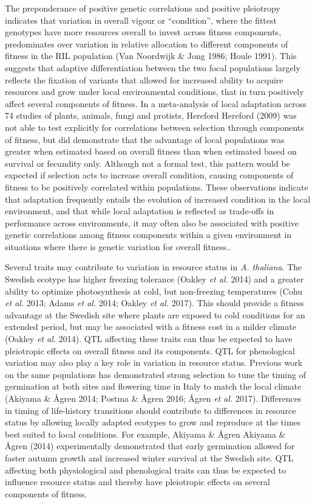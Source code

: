 \documentclass[12pt,]{article}
\begin{document}
The preponderance of positive genetic correlations and positive pleiotropy indicates that variation in overall vigour or ``condition'', where the fittest genotypes have more resources overall to invest across fitness components, predominates over variation in relative allocation to different components of fitness in the RIL population (Van Noordwijk \& Jong 1986; Houle 1991). This suggests that adaptive differentiation between the two focal populations largely reflects the fixation of variants that allowed for increased ability to acquire resources and grow under local environmental conditions, that in turn positively affect several components of fitness.
In a meta-analysis of local adaptation across 74 studies of plants, animals, fungi and protists, Hereford Hereford (2009) was not able to test explicitly for correlations between selection through components of fitness, but did demonstrate that the advantage of local populations was greater when estimated based on overall fitness than when estimated based on survival or fecundity only.
Although not a formal test, this pattern would be expected if selection acts to increase overall condition, causing components of fitness to be positively correlated within populations.
These observations indicate that adaptation frequently entails the evolution of increased condition in the local environment, and that while local adaptation is reflected as trade-offs in performance across environments, it may often also be associated with positive genetic correlations among fitness components within a given environment in situations where there is genetic variation for overall fitness..

Several traits may contribute to variation in resource status in \emph{A. thaliana}. The Swedish ecotype has higher freezing tolerance (Oakley \emph{et al.} 2014) and a greater ability to optimize photosynthesis at cold, but non-freezing temperatures (Cohu \emph{et al.} 2013; Adams \emph{et al.} 2014; Oakley \emph{et al.} 2017). This should provide a fitness advantage at the Swedish site where plants are exposed to cold conditions for an extended period, but may be associated with a fitness cost in a milder climate (Oakley \emph{et al.} 2014). QTL affecting these traits can thus be expected to have pleiotropic effects on overall fitness and its components. QTL for phenological variation may also play a key role in variation in resource status. Previous work on the same populations has demonstrated strong selection to tune the timing of germination at both sites and flowering time in Italy to match the local climate (Akiyama \& Ågren 2014; Postma \& Ågren 2016; Ågren \emph{et al.} 2017). Differences in timing of life-history transitions should contribute to differences in resource status by allowing locally adapted ecotypes to grow and reproduce at the times best suited to local conditions. For example, Akiyama \& Ågren Akiyama \& Ågren (2014) experimentally demonstrated that early germination allowed for faster autumn growth and increased winter survival at the Swedish site. QTL affecting both physiological and phenological traits can thus be expected to influence resource status and thereby have pleiotropic effects on several components of fitness.
\end{document}
